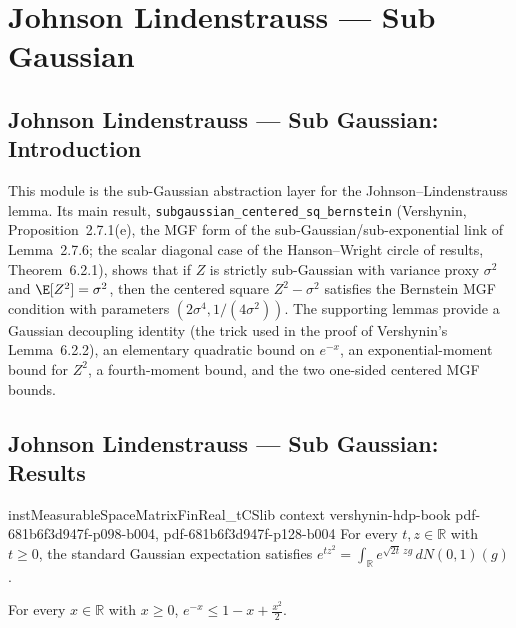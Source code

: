 \section{Johnson Lindenstrauss --- Sub Gaussian}
\subsection*{Johnson Lindenstrauss --- Sub Gaussian: Introduction}

This module is the sub-Gaussian abstraction layer for the Johnson--Lindenstrauss
lemma.  Its main result, \texttt{subgaussian\_centered\_sq\_bernstein}
(Vershynin, Proposition~2.7.1(e), the MGF form of the sub-Gaussian/sub-exponential
link of Lemma~2.7.6; the scalar diagonal case of the Hanson--Wright circle of results,
Theorem~6.2.1), shows that if $Z$ is
strictly sub-Gaussian with variance proxy $\sigma^2$ and $\E[Z^2] = \sigma^2$, then
the centered square $Z^2 - \sigma^2$ satisfies the Bernstein MGF condition with
parameters $(2\sigma^4, 1/(4\sigma^2))$.  The supporting lemmas provide a Gaussian
decoupling identity (the trick used in the proof of Vershynin's Lemma~6.2.2), an elementary quadratic bound on $e^{-x}$, an exponential-moment
bound for $Z^2$, a fourth-moment bound, and the two one-sided centered MGF bounds.

\subsection*{Johnson Lindenstrauss --- Sub Gaussian: Results}

\begin{lemma}
\proofstep
  {instMeasurableSpaceMatrixFinReal_tCSlib}
  {context}
  {vershynin-hdp-book}
  {pdf-681b6f3d947f-p098-b004,
    pdf-681b6f3d947f-p128-b004}
\label{exp_mul_sq_eq_integral_gaussian}
\leanok
{}
For every $t,z\in\mathbb{R}$ with $t\ge0$, the standard Gaussian expectation satisfies
$e^{tz^2}=\int_{\mathbb{R}}e^{\sqrt{2t}\,z g}\,dN(0,1)(g)$.
\end{lemma}

\begin{lemma}
\label{exp_neg_le_one_sub_add_sq_div_two}
\leanok
{}
For every $x\in\mathbb{R}$ with $x\ge0$, $e^{-x}\le 1-x+\frac{x^2}{2}$.
\end{lemma}

